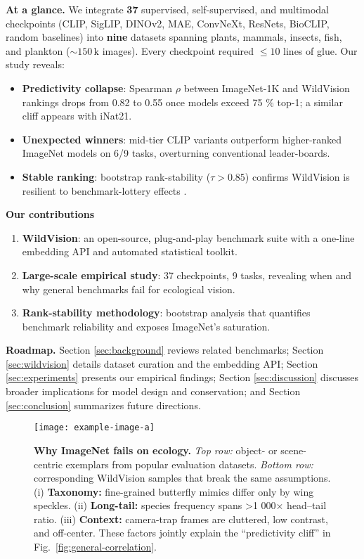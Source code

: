 \documentclass{article}
\begin{document}
\noindent\textbf{At a glance.}
We integrate \textbf{37} supervised, self-supervised, and multimodal checkpoints
(CLIP, SigLIP, DINOv2, MAE, ConvNeXt, ResNets, BioCLIP, random baselines) into
\textbf{nine} datasets spanning plants, mammals, insects, fish, and plankton
(\(\sim\!150\,\text{k}\) images).
Every checkpoint required \(\le\!10\) lines of glue.
Our study reveals:

\begin{itemize}[leftmargin=*]
\item \textbf{Predictivity collapse}: Spearman \(\rho\) between ImageNet-1K and WildVision rankings drops from 0.82 to 0.55 once models exceed 75 \% top-1; a similar cliff appears with iNat21.
\item \textbf{Unexpected winners}: mid-tier CLIP variants outperform higher-ranked ImageNet models on 6/9 tasks, overturning conventional leader-boards.
\item \textbf{Stable ranking}: bootstrap rank-stability (\(\tau > 0.85\)) confirms WildVision is resilient to benchmark-lottery effects \citep{ashmore2021benchmark}.
\end{itemize}

\noindent\textbf{Our contributions}
\begin{enumerate}[leftmargin=*]
\item \textbf{WildVision}: an open-source, plug-and-play benchmark suite with a one-line embedding API and automated statistical toolkit.
\item \textbf{Large-scale empirical study}: 37 checkpoints, 9 tasks, revealing when and why general benchmarks fail for ecological vision.
\item \textbf{Rank-stability methodology}: bootstrap analysis that quantifies benchmark reliability and exposes ImageNet’s saturation.
\end{enumerate}

\noindent\textbf{Roadmap.}
Section \ref{sec:background} reviews related benchmarks; Section \ref{sec:wildvision}
details dataset curation and the embedding API; Section \ref{sec:experiments}
presents our empirical findings; Section \ref{sec:discussion} discusses broader
implications for model design and conservation; and Section \ref{sec:conclusion}
summarizes future directions.






\begin{figure}
    \centering
    \small
    \texttt{[image: example-image-a]}
    \caption{\textbf{Why ImageNet fails on ecology.}
    \emph{Top row:} object- or scene-centric exemplars from popular evaluation datasets.
    \emph{Bottom row:} corresponding WildVision samples that break the same assumptions.
    (i) \textbf{Taxonomy:} fine-grained butterfly mimics differ only by wing speckles.
    (ii) \textbf{Long-tail:} species frequency spans >1 000× head–tail ratio.
    (iii) \textbf{Context:} camera-trap frames are cluttered, low contrast, and off-center.
    These factors jointly explain the ``predictivity cliff'' in Fig.~\ref{fig:general-correlation}.}\label{fig:image-comparison}
\end{figure}
\end{document}
